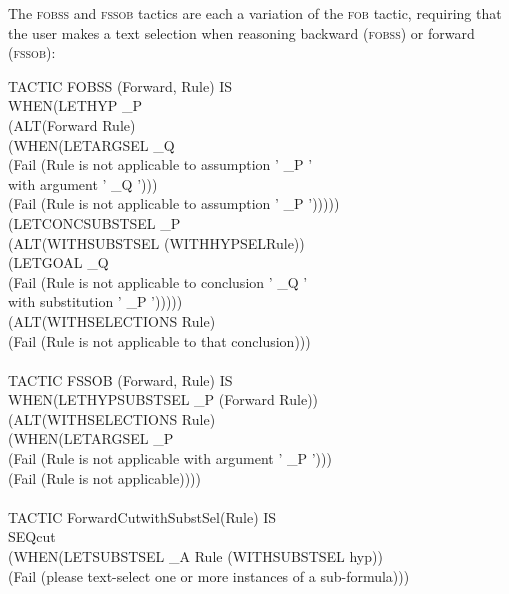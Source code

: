 The \textsc{fobss} and \textsc{fssob} tactics are each a variation of the \textsc{fob} tactic, requiring that the user makes a text selection when reasoning backward (\textsc{fobss}) or forward (\textsc{fssob}):
\begin{japeish}
TACTIC FOBSS (Forward, Rule) IS \\
\tab WHEN\tab (LETHYP \_P\\
\tab \tab \tab (ALT\tab (Forward Rule)\\
\tab \tab \tab \tab (WHEN\tab (LETARGSEL \_Q \\
\tab \tab \tab \tab \tab \tab (Fail (Rule is not applicable to assumption ' \_P ' \\
\tab \tab \tab \tab \tab \tab \tab \tab \tab \tab with argument ' \_Q ')))\\
\tab \tab \tab \tab \tab (Fail (Rule is not applicable to assumption ' \_P '))))) \\
\tab \tab (LETCONCSUBSTSEL \_P \\
\tab \tab \tab (ALT\tab (WITHSUBSTSEL (WITHHYPSELRule))\\
\tab \tab \tab \tab (LETGOAL \_Q\\
\tab \tab \tab \tab \tab (Fail (Rule is not applicable to conclusion ' \_Q '\\
\tab \tab \tab \tab \tab \tab \tab \tab \tab \tab with substitution ' \_P ')))))\\
\tab \tab (ALT\tab (WITHSELECTIONS Rule)\\
\tab \tab \tab (Fail (Rule is not applicable to that conclusion))) \\
\\
TACTIC FSSOB (Forward, Rule) IS \\
\tab WHEN\tab (LETHYPSUBSTSEL \_P (Forward Rule)) \\
\tab \tab (ALT\tab (WITHSELECTIONS Rule)\\
\tab \tab \tab (WHEN\tab (LETARGSEL \_P\\
\tab \tab \tab \tab \tab (Fail (Rule is not applicable with argument ' \_P ')))\\
\tab \tab \tab \tab (Fail (Rule is not applicable)))) \\
\\
TACTIC ForwardCutwithSubstSel(Rule) IS\\
\tab SEQ\tab cut \\
\tab \tab (WHEN\tab (LETSUBSTSEL \_A Rule (WITHSUBSTSEL hyp))\\
\tab \tab \tab \tab (Fail (please text-select one or more instances of a sub-formula)))
\end{japeish}

